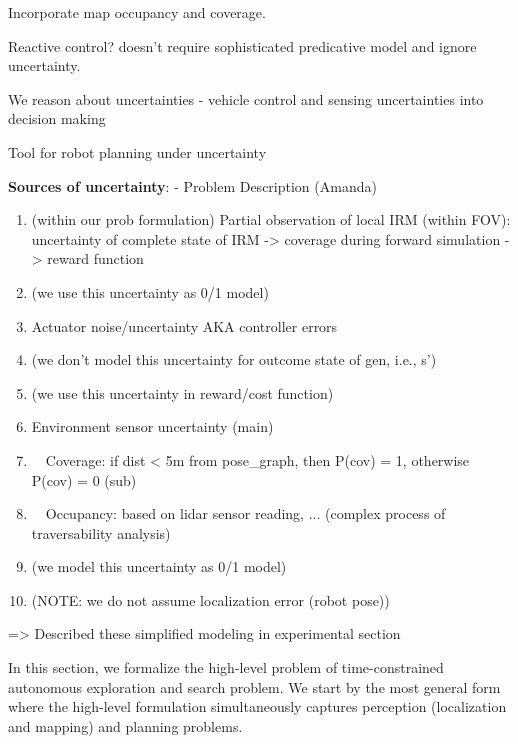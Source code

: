 \documentclass{article}
\newcommand{\ph}[1]{{\textbf{#1}:}} %
\begin{document}
Incorporate map occupancy and coverage.

Reactive control? doesn't require sophisticated predicative model and ignore uncertainty.

We reason about uncertainties - vehicle control and sensing uncertainties into decision making

Tool for robot planning under uncertainty



\ph{Sources of uncertainty} - Problem Description (Amanda)
\begin{enumerate}
    \item (within our prob formulation) Partial observation of local IRM (within FOV): uncertainty of complete state of IRM
    -> coverage during forward simulation -> reward function
    \item (we use this uncertainty as 0/1 model)
    
    \item Actuator noise/uncertainty AKA controller errors
    \item (we don't model this uncertainty for outcome state of gen, i.e., s')
    \item (we use this uncertainty in reward/cost function)
    
    \item Environment sensor uncertainty (main)
    \item \ \ Coverage: if dist < 5m from pose_graph, then P(cov) = 1, otherwise P(cov) = 0 (sub)
    \item \ \ Occupancy: based on lidar sensor reading, ... (complex process of traversability analysis)
    \item (we model this uncertainty as 0/1 model)
    
    \item (NOTE: we do not assume localization error (robot pose))
\end{enumerate}
=> Described these simplified modeling in experimental section

In this section, we formalize the high-level problem of time-constrained autonomous exploration and search problem.
We start by the most general form where the high-level formulation simultaneously captures perception (localization and mapping) and planning problems.
\end{document}
